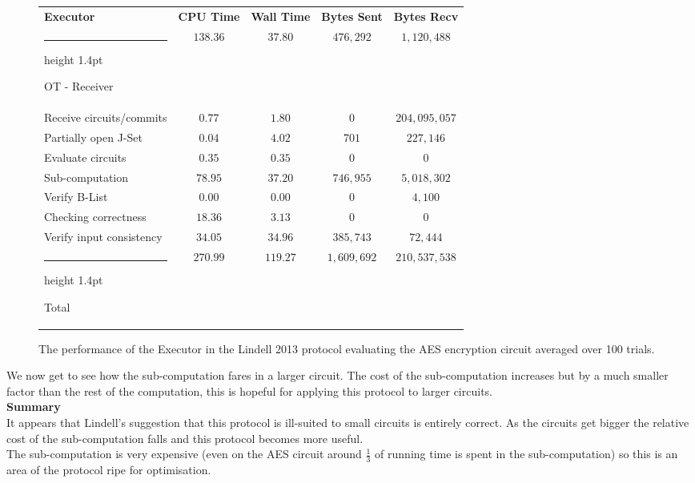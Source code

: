 \documentclass[11pt]{article} %
\makeatletter
\newcommand{\thickhline}{%
    \noalign {\ifnum 0=`}\fi \hrule height 1.4pt
    \futurelet \reserved@a \@xhline
}
\makeatother
\begin{document}
				\begin{figure}[!ht]
					\begin{tabular}{| p{4.3cm} | c c c c |}
						\hline
						\textbf{Executor} & \textbf{CPU Time} & \textbf{Wall Time} & \textbf{Bytes Sent} & \textbf{Bytes Recv} \\
						\thickhline
						OT - Receiver & $138.36$ & $37.80$ & $476,292$ & $1,120,488$ \\
						\hline
						Receive circuits/commits & $0.77$ & $1.80$ & $0$ & $204,095,057$ \\
						\hline
						Partially open J-Set & $0.04$ & $4.02$ & $701$ & $227,146$ \\
						\hline
						Evaluate circuits & $0.35$ & $0.35$ & $0$ & $0$ \\
						\hline
						Sub-computation & $78.95$ & $37.20$ & $746,955$ & $5,018,302$ \\
						\hline
						Verify B-List & $0.00$ & $0.00$ & $0$ & $4,100$ \\
						\hline
						Checking correctness & $18.36$ & $3.13$ & $0$ & $0$ \\
						\hline
						Verify input consistency & $34.05$ & $34.96$ & $385,743$ & $72,444$ \\
						\thickhline
						Total & $270.99$ & $119.27$ & $1,609,692$ & $210,537,538$ \\
						\hline
					\end{tabular}
					\caption{The performance of the Executor in the Lindell 2013 protocol evaluating the AES encryption circuit averaged over 100 trials. \label{table:L_2013_AES_Executor}}
				\end{figure}
				\FloatBarrier

				We now get to see how the sub-computation fares in a larger circuit. The cost of the sub-computation increases but by a much smaller factor than the rest of the computation, this is hopeful for applying this protocol to larger circuits.\\

				\noindent\textbf{Summary}\\

					It appears that Lindell's suggestion that this protocol is ill-suited to small circuits is entirely correct. As the circuits get bigger the relative cost of the sub-computation falls and this protocol becomes more useful.\\

					The sub-computation is very expensive (even on the AES circuit around $\frac{1}{3}$ of running time is spent in the sub-computation) so this is an area of the protocol ripe for optimisation.\\
\end{document}

